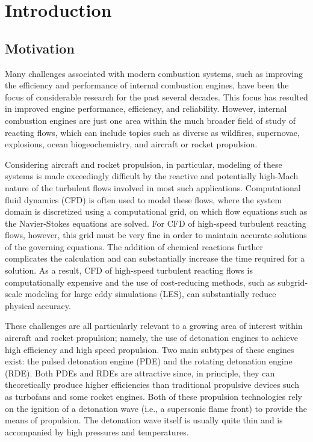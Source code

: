 \chapter{Introduction}
\label{introchap}


\section{Motivation}
Many challenges associated with modern combustion systems, such as improving the efficiency and performance of internal combustion engines, have been the focus of considerable research for the past several decades. This focus has resulted in improved engine performance, efficiency, and reliability. However, internal combustion engines are just one area within the much broader field of study of reacting flows, which can include topics such as diverse as wildfires, supernovae, explosions, ocean biogeochemistry, and aircraft or rocket propulsion.

Considering aircraft and rocket propulsion, in particular, modeling of these systems is made exceedingly difficult by the reactive and potentially high-Mach nature of the turbulent flows involved in most such applications. Computational fluid dynamics (CFD) is often used to model these flows, where the system domain is discretized using a computational grid, on which flow equations such as the Navier-Stokes equations are solved. For CFD of high-speed turbulent reacting flows, however, this grid must be very fine in order to maintain accurate solutions of the governing equations. The addition of chemical reactions further complicates the calculation and can substantially increase the time required for a solution. As a result, CFD of high-speed turbulent reacting flows is computationally expensive and the use of cost-reducing methods, such as subgrid-scale modeling for large eddy simulations (LES), can substantially reduce physical accuracy.  

These challenges are all particularly relevant to a growing area of interest within aircraft and rocket propulsion; namely, the use of detonation engines to achieve high efficiency and high speed propulsion. Two main subtypes of these engines exist: the pulsed detonation engine (PDE) and the rotating detonation engine (RDE). Both PDEs and RDEs are attractive since, in principle, they can theoretically produce higher efficiencies than traditional propulsive devices such as turbofans and some rocket engines. Both of these propulsion technologies rely on the ignition of a detonation wave (i.e., a supersonic flame front) to provide the means of propulsion. The detonation wave itself is usually quite thin and is accompanied by high pressures and temperatures. 

